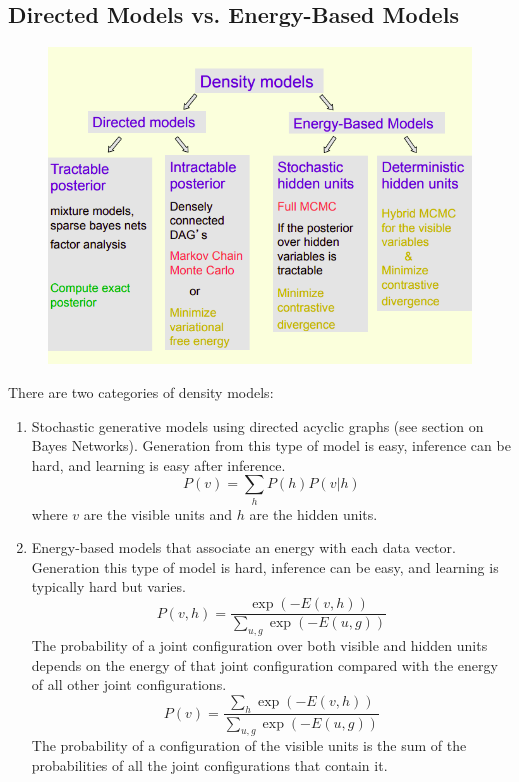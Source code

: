\documentclass{article}
\begin{document}
\subsection{Directed Models vs. Energy-Based Models}
\begin{figure}[H]
    \centering
    \includegraphics[width=12cm]{dag-ebm.png}
\end{figure}

There are two categories of density models:
\begin{enumerate}
    \item Stochastic generative models using directed acyclic graphs (see section on Bayes Networks). Generation from this type of model is easy, inference can be hard, and learning is easy after inference. 
    \[
        P(v) = \sum_h P(h)P(v | h)
    \]
    where $v$ are the visible units and $h$ are the hidden units.
    
    \item Energy-based models that associate an energy with each data vector. Generation this type of model is hard, inference can be easy, and learning is typically hard but varies.
    \[
        P(v, h) = \frac{\exp(-E(v, h))}{\sum_{u, g} \exp(-E(u, g))}
    \]
    The probability of a joint configuration over both visible and hidden units depends on the energy of that joint configuration compared with the energy of all other joint configurations.
    \[
         P(v) = \frac{\sum_{h} \exp(-E(v, h))}{\sum_{u, g} \exp(-E(u, g))}
    \]
    The probability of a configuration of the visible units is the sum of the probabilities of all the joint configurations that contain it. 
\end{enumerate}
\end{document}
